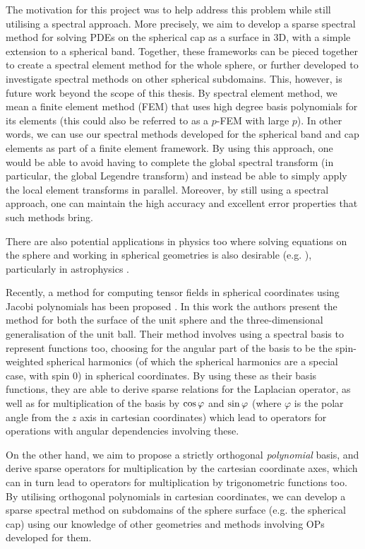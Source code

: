 The motivation for this project was to help address this problem while still utilising a spectral approach. More precisely, we aim to develop a sparse spectral method for solving PDEs on the spherical cap as a surface in 3D, with a simple extension to a spherical band. Together, these frameworks can be pieced together to create a spectral element method for the whole sphere, or further developed to investigate spectral methods on other spherical subdomains. This, however, is future work beyond the scope of this thesis. By spectral element method, we mean a finite element method (FEM) that uses high degree basis polynomials for its elements (this could also be referred to as a $p$-FEM with large $p$). In other words, we can use our spectral methods developed for the spherical band and cap elements as part of a finite element framework. By using this approach, one would be able to avoid having to complete the global spectral transform (in particular, the global Legendre transform) and instead be able to simply apply the local element transforms in parallel. Moreover, by still using a spectral approach, one can maintain the high accuracy and excellent error properties that such methods bring.

There are also potential applications in physics too where solving equations on the sphere and working in spherical geometries is also desirable (e.g. \cite{beyer2014numerical, varshalovich1988quantum, slevinsky2018spectral}), particularly in astrophysics \cite{vasil2019tensor, reinecke2013libsharp}.

Recently, a method for computing tensor fields in spherical coordinates using Jacobi polynomials has been proposed \cite{vasil2019tensor}. In this work the authors present the method for both the surface of the unit sphere and the three-dimensional generalisation of the unit ball. Their method involves using a spectral basis to represent functions too, choosing for the angular part of the basis to be the spin-weighted spherical harmonics (of which the spherical harmonics are a special case, with spin $0$) in spherical coordinates. By using these as their basis functions, they are able to derive sparse relations for the Laplacian operator, as well as for multiplication of the basis by $\cos\varphi$ and $\sin\varphi$ (where $\varphi$ is the polar angle from the $z$ axis in cartesian coordinates) which lead to operators for operations with angular dependencies involving these. 

On the other hand, we aim to propose a strictly orthogonal \textit{polynomial} basis, and derive sparse operators for multiplication by the cartesian coordinate axes, which can in turn lead to operators for multiplication by trigonometric functions too. By utilising orthogonal polynomials in cartesian coordinates, we can develop a sparse spectral method on subdomains of the sphere surface (e.g. the spherical cap) using our knowledge of other geometries and methods involving OPs developed for them.

